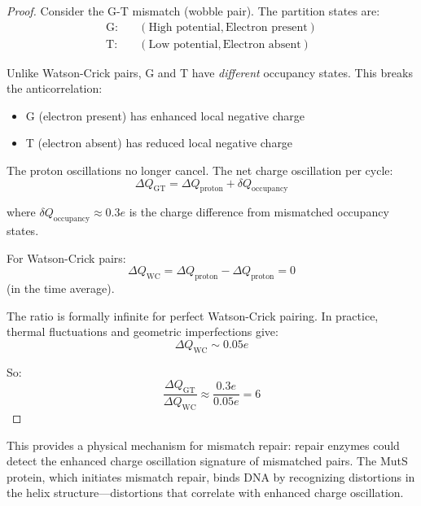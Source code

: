 \documentclass[twocolumn,10pt]{article}
\theoremstyle{remark}
\begin{document}
\begin{proof}
Consider the G-T mismatch (wobble pair). The partition states are:
\begin{align}
\text{G}: &\quad (\text{High potential}, \text{Electron present}) \\
\text{T}: &\quad (\text{Low potential}, \text{Electron absent})
\end{align}

Unlike Watson-Crick pairs, G and T have \textit{different} occupancy states. This breaks the anticorrelation:
\begin{itemize}
\item G (electron present) has enhanced local negative charge
\item T (electron absent) has reduced local negative charge
\end{itemize}

The proton oscillations no longer cancel. The net charge oscillation per cycle:
\begin{equation}
\Delta Q_{\mathrm{GT}} = \Delta Q_{\mathrm{proton}} + \delta Q_{\mathrm{occupancy}}
\end{equation}

where $\delta Q_{\mathrm{occupancy}} \approx 0.3e$ is the charge difference from mismatched occupancy states.

For Watson-Crick pairs:
\begin{equation}
\Delta Q_{\mathrm{WC}} = \Delta Q_{\mathrm{proton}} - \Delta Q_{\mathrm{proton}} = 0
\end{equation}
(in the time average).

The ratio is formally infinite for perfect Watson-Crick pairing. In practice, thermal fluctuations and geometric imperfections give:
\begin{equation}
\Delta Q_{\mathrm{WC}} \sim 0.05e
\end{equation}

So:
\begin{equation}
\frac{\Delta Q_{\mathrm{GT}}}{\Delta Q_{\mathrm{WC}}} \approx \frac{0.3e}{0.05e} = 6
\end{equation}
\end{proof}

This provides a physical mechanism for mismatch repair: repair enzymes could detect the enhanced charge oscillation signature of mismatched pairs. The MutS protein, which initiates mismatch repair, binds DNA by recognizing distortions in the helix structure---distortions that correlate with enhanced charge oscillation.
\end{document}

